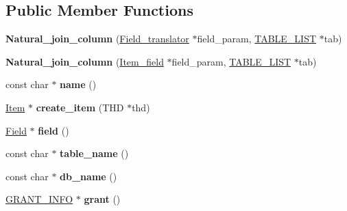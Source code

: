 \subsection*{Public Member Functions}
\begin{DoxyCompactItemize}
\item 
\mbox{\label{classNatural__join__column_a7a02d318822ea42818af16a9b5faff67}} 
{\bfseries Natural\+\_\+join\+\_\+column} (\mbox{\hyperlink{structField__translator}{Field\+\_\+translator}} $\ast$field\+\_\+param, \mbox{\hyperlink{structTABLE__LIST}{T\+A\+B\+L\+E\+\_\+\+L\+I\+ST}} $\ast$tab)
\item 
\mbox{\label{classNatural__join__column_af2516a9d64e6d9de4c3468d201d6520b}} 
{\bfseries Natural\+\_\+join\+\_\+column} (\mbox{\hyperlink{classItem__field}{Item\+\_\+field}} $\ast$field\+\_\+param, \mbox{\hyperlink{structTABLE__LIST}{T\+A\+B\+L\+E\+\_\+\+L\+I\+ST}} $\ast$tab)
\item 
\mbox{\label{classNatural__join__column_a61ec5035a31df2dda93d33be5472fbf4}} 
const char $\ast$ {\bfseries name} ()
\item 
\mbox{\label{classNatural__join__column_a0a2c6b3a865cb882fa8b4a6af57cc100}} 
\mbox{\hyperlink{classItem}{Item}} $\ast$ {\bfseries create\+\_\+item} (T\+HD $\ast$thd)
\item 
\mbox{\label{classNatural__join__column_ad6b6787e9520e2b6acd2f61c27a50d34}} 
\mbox{\hyperlink{classField}{Field}} $\ast$ {\bfseries field} ()
\item 
\mbox{\label{classNatural__join__column_ae0b78befe105fb106835ac7b7db21f5b}} 
const char $\ast$ {\bfseries table\+\_\+name} ()
\item 
\mbox{\label{classNatural__join__column_ab627d2b3e77293618afcc2633fc8eeca}} 
const char $\ast$ {\bfseries db\+\_\+name} ()
\item 
\mbox{\label{classNatural__join__column_abea450d9ada4a5bce59b418bb1a9af11}} 
\mbox{\hyperlink{structGRANT__INFO}{G\+R\+A\+N\+T\+\_\+\+I\+N\+FO}} $\ast$ {\bfseries grant} ()
\end{DoxyCompactItemize}
